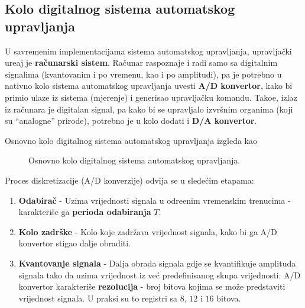 \documentclass[12pt]{IEEEtran}
\numberwithin{equation}{subsection}
\numberwithin{figure}{section}
\begin{document}
\subsection{\textbf{Kolo digitalnog sistema automatskog upravljanja}}
U savremenim implementacijama sistema automatskog upravljanja, upravlja\v{c}ki
ure\dj{}aj je \textbf{ra\v{c}unarski sistem}. Ra\v{c}unar raspoznaje i radi samo sa digitalnim
signalima (kvantovanim i po vremenu, kao i po amplitudi),
pa je potrebno u nativno kolo sistema automatskog upravljanja uvesti \textbf{A/D konvertor},
kako bi primio ulaze iz sistema (mjerenje) i generisao upravlja\v{c}ku komandu.
Tako\dj{}e, izlaz iz ra\v{c}unara je digitalan signal, pa kako bi 
se upravljalo izvr\v{s}nim organima (koji su \enquote{analogne} prirode),
potrebno je u kolo dodati i \textbf{D/A konvertor}.

Osnovno kolo digitalnog sistema automatskog upravljanja izgleda kao

\begin{figure}[h]
    \centering
    \caption{Osnovno kolo digitalnog sistema automatskog upravljanja.}
\end{figure}

Proces diskretizacije (A/D konverzije) odvija se u slede\'{c}im etapama:

\begin{enumerate}
    \item \textbf{Odabira\v{c}} - Uzima vrijednosti signala u odre\dj{}enim vremenskim trenucima -
    karakteri\v{s}e ga \textbf{perioda odabiranja} $T$.
    \item \textbf{Kolo zadr\v{s}ke} - Kolo koje zadr\v{z}ava vrijednost signala, kako bi ga 
    A/D konvertor stigao dalje obraditi.
    \item \textbf{Kvantovanje signala} - Dalja obrada signala gdje se kvantifikuje amplituda signala 
    tako da uzima vrijednost iz ve\'{c} predefinisanog skupa vrijednosti. 
    A/D konvertor karakteri\v{s}e \textbf{rezolucija} - broj bitova 
    kojima se mo\v{z}e predstaviti vrijednost signala. U praksi su to registri
    sa $8$, $12$ i $16$ bitova.
\end{enumerate}
\end{document}
